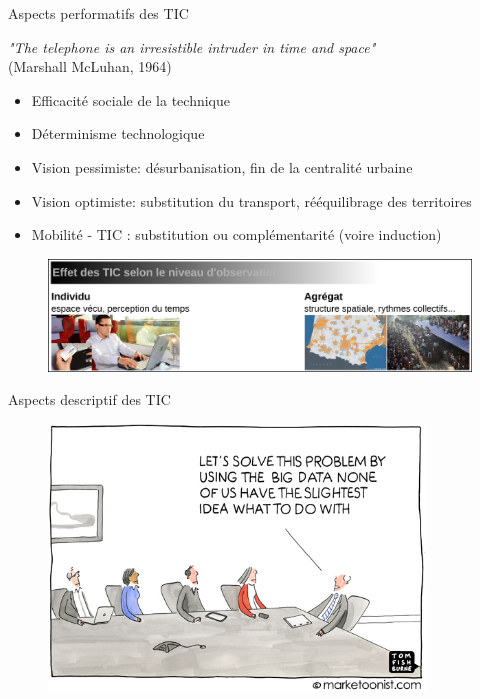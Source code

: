 \documentclass{beamer}
\begin{document}
\begin{frame}{Aspects performatifs des TIC}

\emph{"The telephone is an irresistible intruder in time and space"} ~\\
(Marshall McLuhan, 1964)

\footnotesize
\begin{itemize}
  \item Efficacité sociale de la technique
  \item Déterminisme technologique
  \item Vision pessimiste: désurbanisation, fin de la centralité urbaine
  \item Vision optimiste: substitution du transport, rééquilibrage des territoires
  \item Mobilité - TIC : substitution ou complémentarité (voire induction)
\end{itemize}

\normalsize

\begin{figure}
  \includegraphics[width=12cm]{IndivAgreg.png}
\end{figure}

\end{frame}


\begin{frame}{Aspects descriptif des TIC}

\begin{figure}
  \includegraphics[width=10cm]{bigdata.jpg}
\end{figure}

\end{frame}
\end{document}
